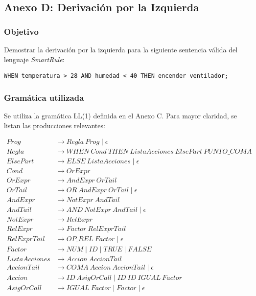 \subsection{Anexo D: Derivación por la Izquierda}

\subsubsection{Objetivo}
Demostrar la derivación por la izquierda para la siguiente sentencia válida del lenguaje \textit{SmartRule}:

\begin{lstlisting}[style=grammartyle]
WHEN temperatura > 28 AND humedad < 40 THEN encender ventilador;
\end{lstlisting}

\subsubsection{Gramática utilizada}
Se utiliza la gramática LL(1) definida en el Anexo C. Para mayor claridad, se listan las producciones relevantes:

\begin{align}
Prog        &\to Regla\ Prog \mid \epsilon\\
Regla       &\to WHEN\ Cond\ THEN\ ListaAcciones\ ElsePart\ PUNTO\_COMA\\
ElsePart    &\to ELSE\ ListaAcciones \mid \epsilon\\
Cond        &\to OrExpr\\
OrExpr      &\to AndExpr\ OrTail\\
OrTail      &\to OR\ AndExpr\ OrTail \mid \epsilon\\
AndExpr     &\to NotExpr\ AndTail\\
AndTail     &\to AND\ NotExpr\ AndTail \mid \epsilon\\
NotExpr     &\to RelExpr\\
RelExpr     &\to Factor\ RelExprTail\\
RelExprTail &\to OP\_REL\ Factor \mid \epsilon\\
Factor      &\to NUM \mid ID \mid TRUE \mid FALSE\\
ListaAcciones &\to Accion\ AccionTail\\
AccionTail    &\to COMA\ Accion\ AccionTail \mid \epsilon\\
Accion        &\to ID\ AsigOrCall \mid ID\ ID\ IGUAL\ Factor\\
AsigOrCall    &\to IGUAL\ Factor \mid Factor \mid \epsilon
\end{align}

